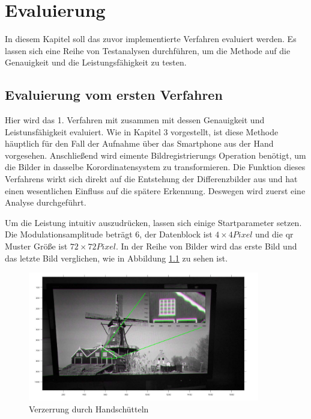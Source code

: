 \chapter{Evaluierung} \label{cha:Evaluierung}

In diesem Kapitel soll das zuvor implementierte Verfahren evaluiert werden. Es lassen sich eine Reihe von Testanalysen durchführen, um die Methode auf die Genauigkeit und die Leistungsfähigkeit zu testen.


\section{Evaluierung vom ersten Verfahren}

Hier wird das 1. Verfahren mit zusammen mit dessen Genauigkeit und Leistunsfähigkeit evaluiert. Wie in Kapitel 3 vorgestellt, ist diese Methode häuptlich für den Fall der Aufnahme über das Smartphone aus der Hand vorgesehen. Anschließend wird eimente Bildregistrierungs Operation benötigt, um die Bilder in dasselbe Korordinatensystem zu transformieren. Die Funktion dieses Verfahrens wirkt sich direkt auf die Entstehung der Differenzbilder aus und hat einen wesentlichen Einfluss auf die spätere Erkennung. Deswegen wird zuerst eine Analyse durchgeführt.

Um die Leistung intuitiv auszudrücken, lassen sich einige Startparameter setzen. Die Modulationsamplitude beträgt 6, der Datenblock ist $ 4 \times 4 Pixel$ und die \gls{qr} Muster Größe ist $ 72 \times 72 Pixel $.  In der Reihe von Bilder wird das erste Bild und das letzte Bild verglichen, wie in Abbildung \ref{fig:vorregistration} zu sehen ist. 
\begin{figure}[H]
 \centering 
  \includegraphics[keepaspectratio,width=0.9\textwidth]{images/5_Implementirung/vorregistration.pdf}
 \caption{Verzerrung durch Handschütteln}
 \label{fig:vorregistration}
\end{figure}

